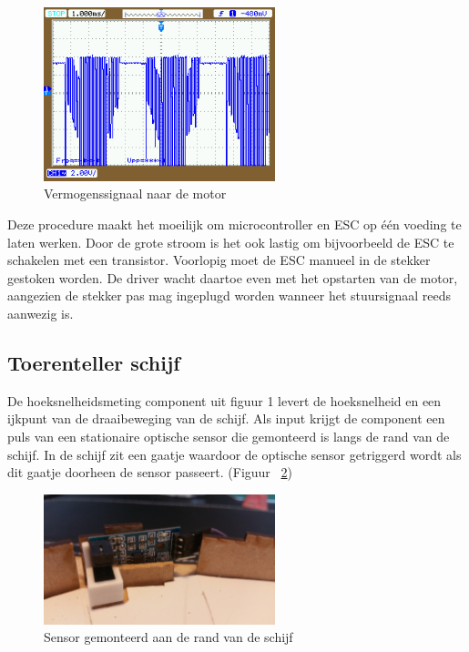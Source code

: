 \documentclass[12pt]{ugentreport}
\begin{document}
\begin{figure}
  \centering
  \includegraphics[width=0.6\textwidth]{img/scoopesc.png}
  \caption{Vermogenssignaal naar de motor}
  \label{fig:motoresc}
\end{figure}

Deze procedure maakt het moeilijk om microcontroller en ESC op één voeding te
laten werken. Door de grote stroom is het ook lastig om bijvoorbeeld de ESC te
schakelen met een transistor. Voorlopig moet de ESC manueel in de stekker
gestoken worden. De driver wacht daartoe even met het opstarten van de motor,
aangezien de stekker pas mag ingeplugd worden wanneer het stuursignaal reeds
aanwezig is.

\subsection{Toerenteller schijf}
De hoeksnelheidsmeting component uit figuur 1 levert de hoeksnelheid en een
ijkpunt van de draaibeweging van de schijf. Als input krijgt de component een
puls van een stationaire optische sensor die gemonteerd is langs de rand van de
schijf. In de schijf zit een gaatje waardoor de optische sensor getriggerd wordt
als dit gaatje doorheen de sensor passeert. (Figuur ~\ref{fig:sensor})

\begin{figure}
  \centering
  \includegraphics[width=0.6\textwidth]{img/Sensor.jpg}
  \caption{Sensor gemonteerd aan de rand van de schijf}
  \label{fig:sensor}
\end{figure}
\end{document}
